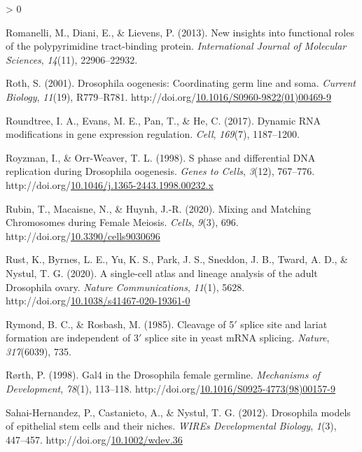 \documentclass[12pt,oneside]{reedthesis}
\newlength{\cslhangindent}
\newenvironment{CSLReferences}[2] %
 {%
  \setlength{\parindent}{0pt}
  \ifodd #1 \everypar{\setlength{\hangindent}{\cslhangindent}}\ignorespaces\fi
  \ifnum #2 > 0
  \setlength{\parskip}{#2\baselineskip}
  \fi
 }%
 {}
\begin{document}
\begin{CSLReferences}{1}{0}
\leavevmode\hypertarget{ref-Romanelli2013}{}%
Romanelli, M., Diani, E., \& Lievens, P. (2013). New insights into functional roles of the polypyrimidine tract-binding protein. \emph{International Journal of Molecular Sciences}, \emph{14}(11), 22906--22932.

\leavevmode\hypertarget{ref-rothDrosophilaOogenesisCoordinating2001}{}%
Roth, S. (2001). Drosophila oogenesis: {Coordinating} germ line and soma. \emph{Current Biology}, \emph{11}(19), R779--R781. http://doi.org/\href{https://doi.org/10.1016/S0960-9822(01)00469-9}{10.1016/S0960-9822(01)00469-9}

\leavevmode\hypertarget{ref-Roundtree2017}{}%
Roundtree, I. A., Evans, M. E., Pan, T., \& He, C. (2017). Dynamic {RNA} modifications in gene expression regulation. \emph{Cell}, \emph{169}(7), 1187--1200.

\leavevmode\hypertarget{ref-Royzman1998}{}%
Royzman, I., \& Orr-Weaver, T. L. (1998). S phase and differential {DNA} replication during {Drosophila} oogenesis. \emph{Genes to Cells}, \emph{3}(12), 767--776. http://doi.org/\href{https://doi.org/10.1046/j.1365-2443.1998.00232.x}{10.1046/j.1365-2443.1998.00232.x}

\leavevmode\hypertarget{ref-rubinMixingMatchingChromosomes2020}{}%
Rubin, T., Macaisne, N., \& Huynh, J.-R. (2020). Mixing and {Matching Chromosomes} during {Female Meiosis}. \emph{Cells}, \emph{9}(3), 696. http://doi.org/\href{https://doi.org/10.3390/cells9030696}{10.3390/cells9030696}

\leavevmode\hypertarget{ref-rustSinglecellAtlasLineage2020}{}%
Rust, K., Byrnes, L. E., Yu, K. S., Park, J. S., Sneddon, J. B., Tward, A. D., \& Nystul, T. G. (2020). A single-cell atlas and lineage analysis of the adult {Drosophila} ovary. \emph{Nature Communications}, \emph{11}(1), 5628. http://doi.org/\href{https://doi.org/10.1038/s41467-020-19361-0}{10.1038/s41467-020-19361-0}

\leavevmode\hypertarget{ref-Rymond1985}{}%
Rymond, B. C., \& Rosbash, M. (1985). Cleavage of 5{\({'}\)} splice site and lariat formation are independent of 3{\({'}\)} splice site in yeast {mRNA} splicing. \emph{Nature}, \emph{317}(6039), 735.

\leavevmode\hypertarget{ref-rorthGal4DrosophilaFemale1998}{}%
Rørth, P. (1998). Gal4 in the {Drosophila} female germline. \emph{Mechanisms of Development}, \emph{78}(1), 113--118. http://doi.org/\href{https://doi.org/10.1016/S0925-4773(98)00157-9}{10.1016/S0925-4773(98)00157-9}

\leavevmode\hypertarget{ref-sahai-hernandezDrosophilaModelsEpithelial2012}{}%
Sahai-Hernandez, P., Castanieto, A., \& Nystul, T. G. (2012). Drosophila models of epithelial stem cells and their niches. \emph{WIREs Developmental Biology}, \emph{1}(3), 447--457. http://doi.org/\href{https://doi.org/10.1002/wdev.36}{10.1002/wdev.36}


\end{CSLReferences}
\end{document}
